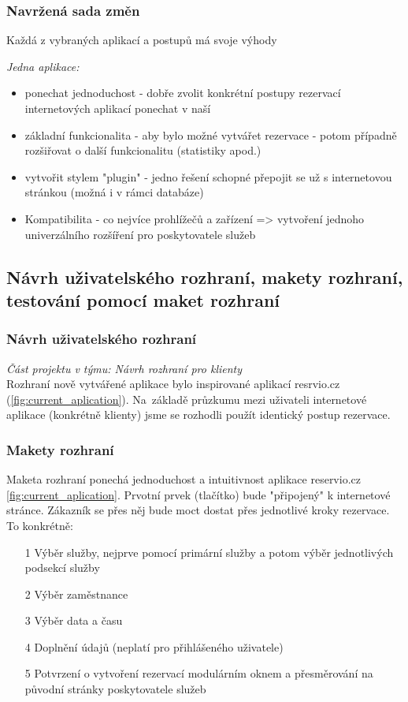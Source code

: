 \subsubsection*{Navržená sada změn}
Každá z vybraných aplikací a postupů má svoje výhody

\noindent\emph{Jedna aplikace:}
\begin{itemize}
    \item ponechat jednoduchost - dobře zvolit konkrétní postupy rezervací\\ internetových aplikací ponechat v naší
    \item základní funkcionalita - aby bylo možné vytvářet rezervace - potom případně rozšiřovat o další funkcionalitu (statistiky apod.)
    \item vytvořit stylem "plugin" - jedno řešení schopné přepojit se už s internetovou stránkou (možná i v rámci databáze)
    \item Kompatibilita - co nejvíce prohlížečů a zařízení => vytvoření jednoho univerzálního rozšíření pro poskytovatele služeb
\end{itemize}

\subsection{Návrh uživatelského rozhraní, makety rozhraní, testování pomocí maket rozhraní}

\subsubsection{Návrh uživatelského rozhraní}
\noindent\emph{Část projektu v týmu: Návrh rozhraní pro klienty}\\
Rozhraní nově vytvářené aplikace bylo inspirované aplikací resrvio.cz (\ref{fig:current_aplication}). Na~základě průzkumu
mezi uživateli internetové aplikace (konkrétně klienty) jsme se rozhodli použít identický postup rezervace.

\subsubsection{Makety rozhraní}
Maketa rozhraní ponechá jednoduchost a intuitivnost aplikace reservio.cz \ref{fig:current_aplication}. Prvotní prvek (tlačítko)
bude "připojený" k internetové stránce. Zákazník se přes něj bude moct dostat přes jednotlivé kroky rezervace.  \\
To konkrétně:\\
\begin{itemize}
    \item[1] Výběr služby, nejprve pomocí primární služby a potom výběr jednotlivých podsekcí služby
    \item[2] Výběr zaměstnance
    \item[3] Výběr data a času
    \item[4] Doplnění údajů (neplatí pro přihlášeného uživatele)
    \item[5] Potvrzení o vytvoření rezervací modulárním oknem a přesměrování na původní stránky poskytovatele služeb
\end{itemize}


